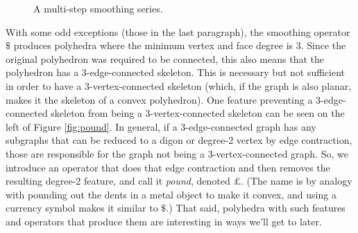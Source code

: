 \documentclass{amsart}[12pt]
\begin{document}
\begin{figure}

\caption{A multi-step smoothing series.}
\label{fig:multismooth}
\end{figure}

With some odd exceptions (those in the last paragraph), the smoothing operator
$\$$ produces polyhedra where the minimum vertex and face degree is 3. Since
the original polyhedron was required to be connected, this also means that the
polyhedron has a 3-edge-connected skeleton. This is necessary but not
sufficient in order to have a 3-vertex-connected skeleton (which, if the graph
is also planar, makes it the skeleton of a convex polyhedron). One feature
preventing a 3-edge-connected skeleton from being a 3-vertex-connected skeleton
can be seen on the left of Figure \ref{fig:pound}. In general, if a
3-edge-connected graph has any subgraphs that can be reduced to a digon or
degree-2 vertex by edge contraction, those are responsible for the graph not
being a 3-vertex-connected graph. So, we introduce an operator that does that
edge contraction and then removes the resulting degree-2 feature, and call it
\textit{pound}, denoted $\pounds$. (The name is by analogy with pounding out
the dents in a metal object to make it convex, and using a currency symbol
makes it similar to $\$$.) That said, polyhedra with such features and
operators that produce them are interesting in ways we'll get to later.
\end{document}
